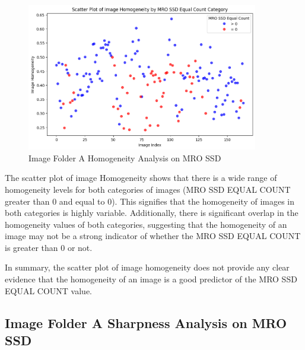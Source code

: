 \begin{figure}[ht]
    \centering
    \includegraphics[width=0.9\textwidth]{Figures/Results/sipa_02/homogeneity.png}
    \caption[Image Folder A Homogeneity Analysis on MRO SSD]{Image Folder A Homogeneity Analysis on MRO SSD}
    \label{fig:Image Folder A Homogeneity Analysis on MRO SSD}
\end{figure}


The scatter plot of image Homogeneity shows that there is a wide range of homogeneity levels for both categories of images (MRO SSD EQUAL COUNT greater than 0 and equal to 0). This signifies that the homogeneity of images in both categories is highly variable. Additionally, there is significant overlap in the homogeneity values of both categories, suggesting that the homogeneity of an image may not be a strong indicator of whether the MRO SSD EQUAL COUNT is greater than 0 or not.



In summary, the scatter plot of image homogeneity does not provide any clear evidence that the homogeneity of an image is a good predictor of the MRO SSD EQUAL COUNT value.

\newpage

\subsection{Image Folder A Sharpness Analysis on MRO SSD}


